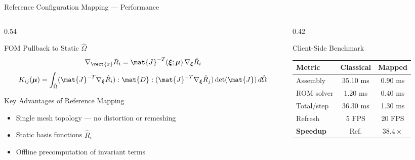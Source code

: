 \begin{frame}{Reference Configuration Mapping — Performance}
  \small
  \begin{columns}[T]
    \begin{column}{0.54\textwidth}
      \begin{block}{FOM Pullback to Static $\hat{\Omega}$}
        \footnotesize
        \vspace{-0.15cm}
        \[
          \nabla_{\vect{x}}R_i = \mat{J}^{-T}(\boldsymbol{\xi};\boldsymbol{\mu})\,\nabla_{\boldsymbol{\xi}}\hat{R}_i
        \]
        \vspace{-0.3cm}
        \[
          K_{ij}(\boldsymbol{\mu}) = \int_{\hat{\Omega}} (\mat{J}^{-T}\nabla_{\boldsymbol{\xi}}\hat{R}_i):\mat{D}:(\mat{J}^{-T}\nabla_{\boldsymbol{\xi}}\hat{R}_j)\det(\mat{J})\,d\hat{\Omega}
        \]
        \vspace{-0.2cm}
      \end{block}
      \vspace{-0.05cm}
      \begin{exampleblock}{Key Advantages of Reference Mapping}
        \footnotesize
        \begin{itemize}
          \setlength{\itemsep}{1pt}
          \item Single mesh topology — no distortion or remeshing
          \item Static basis functions $\hat{R}_i$
          \item Offline precomputation of invariant terms
        \end{itemize}
      \end{exampleblock}
    \end{column}
    \begin{column}{0.42\textwidth}
      \begin{block}{Client-Side Benchmark}
        \centering\footnotesize
        \begin{tabular}{lcc}
          \toprule
          \textbf{Metric} & \textbf{Classical} & \textbf{Mapped} \\
          \midrule
          Assembly   & 35.10 ms & 0.90 ms \\
          ROM solver & 1.20 ms  & 0.40 ms \\
          Total/step & 36.30 ms & 1.30 ms \\
          Refresh    & 5 FPS    & 20 FPS  \\
          \midrule
          \textbf{Speedup} & Ref. & $\mathbf{38.4\times}$ \\
          \bottomrule
        \end{tabular}
      \end{block}
    \end{column}
  \end{columns}
\end{frame}

